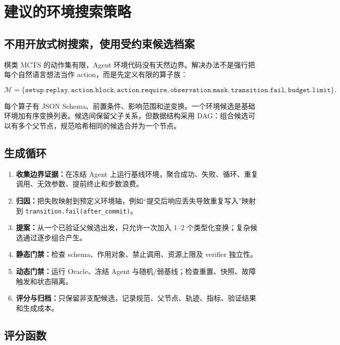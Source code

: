 \documentclass[11pt,a4paper,fontset=fandol]{ctexart}
\newcommand{\code}[1]{\texttt{#1}}
\begin{document}
\section{建议的环境搜索策略}

\subsection{不用开放式树搜索，使用受约束候选档案}

棋类 MCTS 的动作集有限，Agent 环境代码没有天然边界。解决办法不是强行把每个自然语言想法当作 action，而是先定义有限的算子族：

\begin{equation}
\mathcal{M}=\{\texttt{setup.replay},\texttt{action.block},\texttt{action.require},
\texttt{observation.mask},\texttt{transition.fail},\texttt{budget.limit}\}.
\end{equation}

每个算子有 JSON Schema、前置条件、影响范围和逆变换。一个环境候选是基础环境加有序变换列表。候选间保留父子关系，但数据结构采用 DAG：组合候选可以有多个父节点，规范哈希相同的候选合并为一个节点。

\subsection{生成循环}

\begin{enumerate}
  \item \textbf{收集边界证据：}在冻结 Agent 上运行基线环境，聚合成功、失败、循环、重复调用、无效参数、提前终止和步数浪费。
  \item \textbf{归因：}把失败映射到预定义环境轴，例如“提交后响应丢失导致重复写入”映射到 \code{transition.fail(after\_commit)}。
  \item \textbf{提案：}从一个已验证父候选出发，只允许一次加入 1--2 个类型化变换；复杂候选通过逐步组合产生。
  \item \textbf{静态门禁：}检查 schema、作用对象、禁止调用、资源上限及 verifier 独立性。
  \item \textbf{动态门禁：}运行 Oracle、冻结 Agent 与随机/弱基线；检查重置、快照、故障触发和状态隔离。
  \item \textbf{评分与归档：}只保留非支配候选，记录规范、父节点、轨迹、指标、验证结果和生成成本。
\end{enumerate}

\subsection{评分函数}
\end{document}
